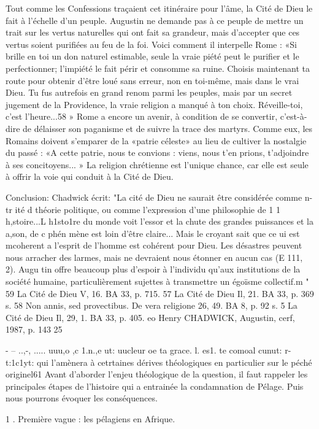 Tout comme les Confessions traçaient cet itinéraire pour l'âme, la Cité de Dieu le fait  à l'échelle d'un peuple. Augustin ne demande pas à ce peuple de mettre un trait sur les vertus naturelles qui ont fait sa grandeur, mais d'accepter que ces vertus soient purifiées au feu de la foi. Voici comment il interpelle Rome : «Si brille en toi un don naturel estimable, seule la vraie piété peut le purifier et le perfectionner; l'impiété le fait périr et consomme sa ruine. Choisis maintenant ta route pour obtenir d'être loué sans erreur, non en toi-même, mais dans le vrai Dieu. Tu fus autrefois en grand renom parmi les peuples, mais par un secret jugement de la Providence, la vraie religion a manqué à ton choix. Réveille-toi, c'est l'heure...58 » Rome a encore un avenir, à condition de se convertir, c'est-à-dire de délaisser son paganisme et de suivre la trace des martyrs. Comme eux, les Romains doivent s'emparer de la «patrie céleste» au lieu de cultiver la nostalgie du passé : «A cette patrie, nous te convions : viens, nous t'en prions, t'adjoindre à ses concitoyens... » La religion chrétienne est l'unique chance, car elle est seule à offrir la voie qui conduit à la Cité de Dieu.

Conclusion:  Chadwick écrit: "La cité de Dieu ne saurait être considérée comme
n-  tr ité	d	théorie	politique,	ou	comme	l'expression	d'une	philosophie	de
1
1 h,stoire...L h1sto1re du monde voit l'essor et la chute des grandes puissances et la a,son, de c phén mène est loin d'être claire... Mais le croyant sait que ce ui est mcoherent a l'esprit de l'homme est cohérent pour Dieu. Les désastres peuvent nous arracher des larmes, mais ne devraient nous étonner en aucun cas (E 111, 2). Augu tin offre beaucoup plus d'espoir à l'individu qu'aux institutions de la société humaine, particulièrement sujettes à transmettre un égoïsme collectif.m "
59 La Cité de Dieu V, 16. BA 33, p. 715.
57 La Cité de Dieu Il, 21. BA 33, p. 369 s.
58
Non annis, sed provectibus. De vera religione 26, 49. BA 8, p. 92 s.
5 La Cité de Dieu Il, 29, 1. BA 33, p. 405.
eo Henry CHADWICK, Augustin, cerf, 1987, p. 143
25
 
-  --  ..,-, .....  uuu,o ,c 1.n.,e ut: uucleur oe ta grace. l. es1. te comoal cunut: r-t:1c1yt:
qui l'amènera à cetrtaines dérives théologiques en particulier sur le péché originel61   Avant d'aborder l'enjeu théologique de la question, il faut rappeler les principales étapes de l'histoire qui a entrainée la condamnation de Pélage. Puis nous pourrons évoquer les conséquences.

1 . Première  vague : les pélagiens  en Afrique.

